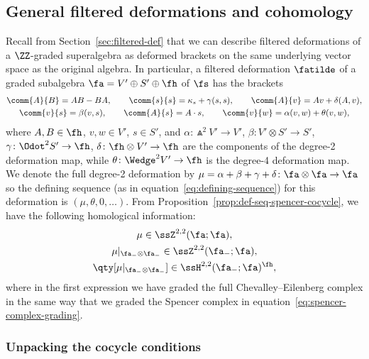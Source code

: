 \subsection{General filtered deformations and cohomology}
\label{sec:filtered-def-cohom}

Recall from Section~\ref{sec:filtered-def} that we can describe filtered deformations of a $\ZZ$-graded superalgebra as deformed brackets on the same underlying vector space as the original algebra. In particular, a filtered deformation $\fatilde$ of a graded subalgebra $\fa=V'\oplus S'\oplus \fh$ of $\fs$ has the brackets
\begin{gather}
	\comm{A}{B} = AB-BA,\qquad
	\comm{s}{s} = \kappa_s + \gamma(s,s),\qquad
	\comm{A}{v} = Av + \delta(A,v),
	\nonumber\\
	\comm{v}{s} = \beta(v,s),\qquad\comm{A}{s} = A\cdot s
	, \qquad\comm{v}{w} = \alpha(v,w) + \theta(v,w),\label{eq:def-brackets-general}
\end{gather}
where $A,B\in\fh$, $v,w\in V'$, $s\in S'$, and
$\alpha\colon \Wedge^2V' \to V'$, $
	\beta\colon V'\otimes S' \to S'$, $
	\gamma\colon \Odot^2 S' \to \fh$, $
	\delta\colon \fh\otimes V' \to \fh
$
are the components of the degree-2 deformation map, while
$\theta\colon \Wedge^2 V' \to \fh
$
is the degree-4 deformation map. We denote the full degree-2 deformation by
${\mu=\alpha+\beta+\gamma+\delta\colon \fa\otimes\fa \to \fa}
$
so the defining sequence (as in equation~\eqref{eq:defining-sequence}) for this deformation is $(\mu,\theta,0,\dots)$. From Proposition~\ref{prop:def-seq-spencer-cocycle}, we have the following homological information:
\begin{gather}
	\mu \in \ssZ^{2,2}(\fa;\fa),	\label{eq:mu-CE-cocycle}	\\
	\mu|_{\fa_-\otimes\fa_-} \in \ssZ^{2,2}(\fa_-;\fa),	\label{eq:mu-spencer-cocycle}	\\
	\qty[\mu|_{\fa_-\otimes\fa_-}] \in \ssH^{2,2}(\fa_-;\fa)^\fh, \label{eq:mu-invt-class}
\end{gather}
where in the first expression we have graded the full Chevalley--Eilenberg complex in the same way that we graded the Spencer complex in equation~\eqref{eq:spencer-complex-grading}.

\subsubsection{Unpacking the cocycle conditions}

